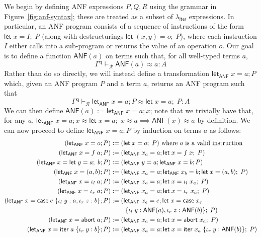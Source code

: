 \documentclass[acmsmall,screen,review]{acmart}
\newcommand{\mc}[1]{\ensuremath{\mathcal{#1}}}
\newcommand{\mb}[1]{\ensuremath{\mathbf{#1}}}
\newcommand{\ms}[1]{\ensuremath{\mathsf{#1}}}
\newcommand{\lto}{:}
\newcommand{\linl}[1]{\iota_l\;{#1}}
\newcommand{\linr}[1]{\iota_r\;{#1}}
\newcommand{\labort}[1]{\ms{abort}\;{#1}}
\newcommand{\letexpr}[3]{\ensuremath{\ms{let}\;#1 = #2;\;#3}}
\newcommand{\caseexpr}[5]{\ms{case}\;#1\;\{\linl{#2} \lto #3, \linr{#4} \lto #5\}}
\newcommand{\liter}[3]{\ms{iter}\;#1\;\{ \linr{#2} \lto #3 \}}
\newcommand{\teqv}{\approx}
\newcommand{\tmeq}[5]{#1 \vdash_{#2} #3 \teqv #4 : {#5}}
\newcommand{\toanf}[1]{\ms{ANF}(#1)}
\newcommand{\anflet}[3]{\ms{let}_{\ms{ANF}}\;#1 = #2; #3}
\newcommand{\subiterexp}{\texorpdfstring{\(\lambda_{\ms{iter}}\)}{lambda-iter}}
\begin{document}
We begin by defining ANF expressions $P, Q, R$ using the grammar in Figure~\ref{fig:anf-syntax};
these are treated as a subset of \subiterexp{} expressions. In particular, an ANF program consists
of a sequence of instructions of the form $\letexpr{x}{I}{P}$ (along with destructurings
$\letexpr{(x, y)}{o}{P}$), where each instruction $I$ either calls into a sub-program or returns the
value of an operation $o$. Our goal is to define a function $\toanf{a}$ on terms such that, for
all well-typed terms $a$,
\begin{equation*}
  \tmeq{\Gamma^{\mb{q}}}{\mc{R}}{\toanf{a}}{a}{A}
\end{equation*}
Rather than do so directly, we will instead define a transformation $\anflet{x}{a}{P}$ which, given
an ANF program $P$ and a term $a$, returns an ANF program such that
\begin{equation*}
  \tmeq{\Gamma^{\mb{q}}}{\mc{R}}{\anflet{x}{a}{P}}{\letexpr{x}{a}{P}}{A}
\end{equation*}
We can then define $\toanf{a} := \anflet{x}{a}{x}$; note that we trivially have that, for any $a$,
$\anflet{x}{a}{x} \approx \letexpr{x}{a}{x} \approx a \implies \toanf{x} \approx a$ by definition.
We can now proceed to define $\anflet{x}{a}{P}$ by induction on terms $a$ as follows:
\begin{align*}
  (\anflet{x}{o}{P}) &:= (\letexpr{x}{o}{P}) \text{ where } o \text{ is a valid instruction} \\
  (\anflet{x}{f\;a}{P}) &:= (\anflet{x_a}{a}{\letexpr{x}{f\;x}{P}}) \\
  (\anflet{x}{\letexpr{y}{a}{b}}{P}) &:= (\anflet{y}{a}{\anflet{x}{b}{P}}) \\
  (\anflet{x}{(a, b)}{P}) &:= (\anflet{x_a}{a}{\anflet{x_b}{b}{\letexpr{x}{(a, b)}{P}}}) \\
  (\anflet{x}{\linl{a}}{P}) &:= (\anflet{x_a}{a}{\letexpr{x}{\linl{x_a}}{P}}) \\
  (\anflet{x}{\linr{a}}{P}) &:= (\anflet{x_a}{a}{\letexpr{x}{\linr{x_a}}{P}}) \\
  (\anflet{x}{\caseexpr{e}{y}{a}{z}{b}}{P}) 
    &:= (\anflet{x_e}{e}{\letexpr{x}{\caseexpr{x_e \\ & \qquad}{y}{\toanf{a}}{z}{\toanf{b}}}}{P}) \\
  (\anflet{x}{\labort{a}}{P}) &:= (\anflet{x_a}{a}{\letexpr{x}{\labort{x_a}}{P}}) \\
  (\anflet{x}{\liter{a}{y}{b}}{P}) 
    &:= (\anflet{x_a}{a}{\letexpr{x}{\liter{x_a}{y}{\toanf{b}}}{P}})
\end{align*}
\end{document}

